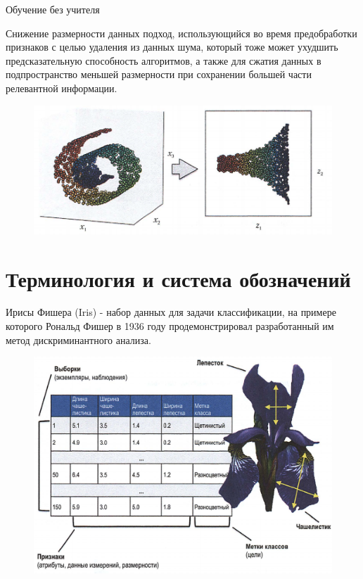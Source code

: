 \documentclass{beamer}
\begin{document}
\begin{frame}[t]{Обучение без учителя}
\begin{block}{Снижение размерности данных}
подход, использующийся во время предобработки признаков с целью удаления из данных шума, который тоже может ухудшить предсказательную способность алгоритмов, а также для сжатия данных в подпространство меньшей размерности при сохранении большей части релевантной информации.
\end{block}
\begin{figure}[h]
\centering
\includegraphics[scale=0.35]{images/lec01-pic09.png}
\end{figure}
\end{frame}

\section{Терминология и система обозначений}
\begin{frame}[t]
Ирисы Фишера (Iris) - набор данных для задачи классификации, на примере которого Рональд Фишер в 1936 году продемонстрировал разработанный им метод дискриминантного анализа. 
\begin{figure}[h]
\centering
\includegraphics[scale=0.35]{images/lec01-pic10.png}
\end{figure}
\end{frame}
\end{document}
